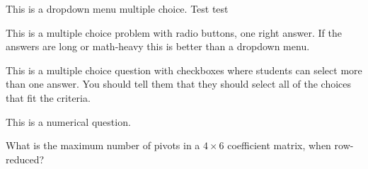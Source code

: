 

This is a dropdown menu multiple choice.  Test test



\edXsolution{ 
}

\endedxproblem





This is a multiple choice problem with radio buttons, one right answer.  If the answers are 
long or math-heavy this is better than a dropdown menu.  


\edXsolution{ 
}

\endedxproblem



This is a multiple choice question with checkboxes 
where students can select more than one answer.  You should tell them
that they should select all of the choices that fit the criteria.  


\edXsolution{ 
}

\endedxproblem



This is a numerical question.  

What is the maximum number of pivots in a $4\times 6$ coefficient  matrix, when row-reduced?  




\edXsolution{ 
}

\endedxproblem




